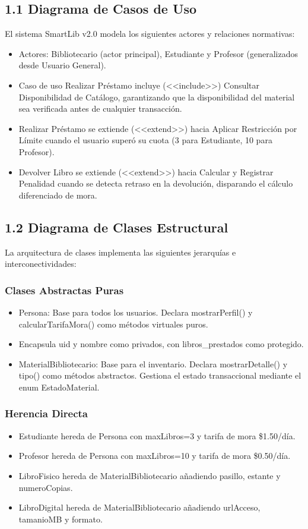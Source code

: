 \documentclass[12pt,a4paper]{article}
\begin{document}
\subsection{1.1 Diagrama de Casos de Uso}
El sistema SmartLib v2.0 modela los siguientes actores y relaciones normativas:
\begin{itemize}
    \item Actores: Bibliotecario (actor principal), Estudiante y Profesor (generalizados desde Usuario General).
    \item Caso de uso Realizar Préstamo incluye (<<include>>) Consultar Disponibilidad de Catálogo, garantizando que la disponibilidad del material sea verificada antes de cualquier transacción.
    \item Realizar Préstamo se extiende (<<extend>>) hacia Aplicar Restricción por Límite cuando el usuario superó su cuota (3 para Estudiante, 10 para Profesor).
    \item Devolver Libro se extiende (<<extend>>) hacia Calcular y Registrar Penalidad cuando se detecta retraso en la devolución, disparando el cálculo diferenciado de mora.
\end{itemize}

\subsection{1.2 Diagrama de Clases Estructural}
La arquitectura de clases implementa las siguientes jerarquías e interconectividades:

\subsubsection*{Clases Abstractas Puras}
\begin{itemize}
    \item Persona: Base para todos los usuarios. Declara mostrarPerfil() y calcularTarifaMora() como métodos virtuales puros.
    \item Encapsula uid y nombre como privados, con libros\_prestados como protegido.
    \item MaterialBibliotecario: Base para el inventario. Declara mostrarDetalle() y tipo() como métodos abstractos. Gestiona el estado transaccional mediante el enum EstadoMaterial.
\end{itemize}

\subsubsection*{Herencia Directa}
\begin{itemize}
    \item Estudiante hereda de Persona con maxLibros=3 y tarifa de mora \$1.50/día.
    \item Profesor hereda de Persona con maxLibros=10 y tarifa de mora \$0.50/día.
    \item LibroFisico hereda de MaterialBibliotecario añadiendo pasillo, estante y numeroCopias.
    \item LibroDigital hereda de MaterialBibliotecario añadiendo urlAcceso, tamanioMB y formato.
\end{itemize}
\end{document}
